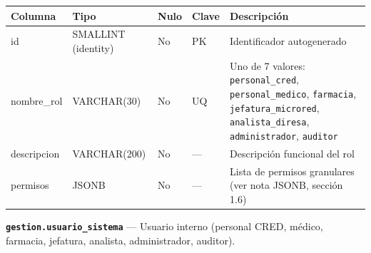 \documentclass[11pt,a4paper]{article}
\begin{document}
{\small
\begin{longtable}[]{@{}
  >{\raggedright\arraybackslash}p{}
  >{\raggedright\arraybackslash}p{}
  >{\raggedright\arraybackslash}p{}
  >{\raggedright\arraybackslash}p{}
  >{\raggedright\arraybackslash}p{}@{}}
\toprule\noalign{}
\begin{minipage}[b]{\linewidth}\raggedright
Columna
\end{minipage} & \begin{minipage}[b]{\linewidth}\raggedright
Tipo
\end{minipage} & \begin{minipage}[b]{\linewidth}\raggedright
Nulo
\end{minipage} & \begin{minipage}[b]{\linewidth}\raggedright
Clave
\end{minipage} & \begin{minipage}[b]{\linewidth}\raggedright
Descripción
\end{minipage} \\
\midrule\noalign{}
\endhead
\bottomrule\noalign{}
\endlastfoot
id & SMALLINT (identity) & No & PK & Identificador autogenerado \\
nombre\_rol & VARCHAR(30) & No & UQ & Uno de 7 valores: \texttt{personal\_cred}, \texttt{personal\_medico}, \texttt{farmacia}, \texttt{jefatura\_microred}, \texttt{analista\_diresa}, \texttt{administrador}, \texttt{auditor} \\
descripcion & VARCHAR(200) & No & --- & Descripción funcional del rol \\
permisos & JSONB & No & --- & Lista de permisos granulares (ver nota JSONB, sección 1.6) \\
\end{longtable}
}

\textbf{\texttt{gestion.usuario\_sistema}} --- Usuario interno (personal CRED, médico, farmacia, jefatura, analista, administrador, auditor).
\end{document}
